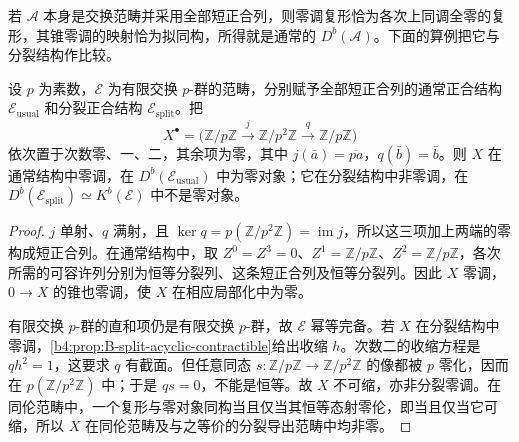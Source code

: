 \ProseParagraphBreak
若 \(\mathcal A\) 本身是交换范畴并采用全部短正合列，则零调复形恰为各次上同调全零的复形，其锥零调的映射恰为拟同构，所得就是通常的 \(D^b(\mathcal A)\)。下面的算例把它与分裂结构作比较。

\begin{proposition}\label{b4:prop:B-two-exact-zeroes}
	设 \(p\) 为素数，\(\mathcal E\) 为有限交换 \(p\)-群的范畴，分别赋予全部短正合列的通常正合结构 \(\mathcal E_{\mathrm{usual}}\) 和分裂正合结构 \(\mathcal E_{\mathrm{split}}\)。把
	\[
		X^\bullet= \bigl(\mathbb Z/p\mathbb Z\xrightarrow{j} \mathbb Z/p^2\mathbb Z\xrightarrow{q}\mathbb Z/p\mathbb Z\bigr)
	\]
	依次置于次数零、一、二，其余项为零，其中 \(j(\bar a)=\overline{pa}\)，\(q(\bar b)=\bar b\)。则 \(X\) 在通常结构中零调，在 \(D^b(\mathcal E_{\mathrm{usual}})\) 中为零对象；它在分裂结构中非零调，在 \(D^b(\mathcal E_{\mathrm{split}})\simeq K^b(\mathcal E)\) 中不是零对象。
\end{proposition}
\begin{proof}
	\(j\) 单射、\(q\) 满射，且 \(\ker q=p(\mathbb Z/p^2\mathbb Z)=\operatorname{im}j\)，所以这三项加上两端的零构成短正合列。在通常结构中，取 \(Z^0=Z^3=0\)、\(Z^1=\mathbb Z/p\mathbb Z\)、\(Z^2=\mathbb Z/p\mathbb Z\)，各次所需的可容许列分别为恒等分裂列、这条短正合列及恒等分裂列。因此 \(X\) 零调，\(0\to X\) 的锥也零调，使 \(X\) 在相应局部化中为零。

	有限交换 \(p\)-群的直和项仍是有限交换 \(p\)-群，故 \(\mathcal E\) 幂等完备。若 \(X\) 在分裂结构中零调，\cref{b4:prop:B-split-acyclic-contractible}给出收缩 \(h\)。次数二的收缩方程是 \(qh^2=1\)，这要求 \(q\) 有截面。但任意同态 \(s:\mathbb Z/p\mathbb Z\to\mathbb Z/p^2\mathbb Z\) 的像都被 \(p\) 零化，因而在 \(p(\mathbb Z/p^2\mathbb Z)\) 中；于是 \(qs=0\)，不能是恒等。故 \(X\) 不可缩，亦非分裂零调。在同伦范畴中，一个复形与零对象同构当且仅当其恒等态射零伦，即当且仅当它可缩，所以 \(X\) 在同伦范畴及与之等价的分裂导出范畴中均非零。
\end{proof}
